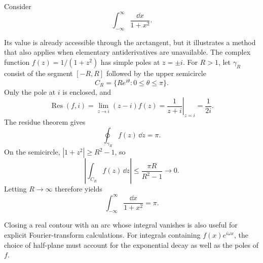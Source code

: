 \begin{example}
Consider
\[
\int_{-\infty}^{\infty}\frac{\dd x}{1+x^2}.
\]

Its value is already accessible through the arctangent, but it illustrates a method that also applies when elementary antiderivatives are unavailable. The complex function $f(z)=1/(1+z^2)$ has simple poles at $z=\pm i$. For $R>1$, let $\gamma_R$ consist of the segment $[-R,R]$ followed by the upper semicircle
\[
C_R = \{Re^{i\theta}:0 \leq \theta \leq \pi\}.
\]
Only the pole at $i$ is enclosed, and
\begin{equation}
\operatorname{Res}(f,i)
=\lim_{z\to i}(z-i)f(z)
=\left.\frac{1}{z+i}\right|_{z=i}=\frac{1}{2i}.
\end{equation}
The residue theorem gives
\[
\oint_{\gamma_R}f(z)\,\dd z=\pi.
\]
On the semicircle, $|1+z^2|\geq R^2-1$, so
\begin{equation}
\left|\int_{C_R}f(z)\,\dd z\right|
\leq\frac{\pi R}{R^2-1}\longrightarrow0.
\end{equation}
Letting $R\to\infty$ therefore yields
\begin{equation}
\int_{-\infty}^{\infty}\frac{\dd x}{1+x^2}=\pi.
\end{equation}

Closing a real contour with an arc whose integral vanishes is also useful for explicit Fourier-transform calculations. For integrals containing $f(x)e^{i\omega x}$, the choice of half-plane must account for the exponential decay as well as the poles of $f$.
\end{example}


